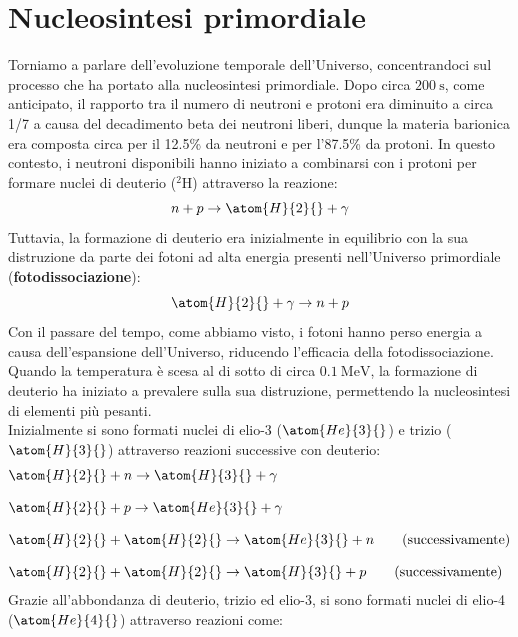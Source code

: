 \section{Nucleosintesi primordiale}
Torniamo a parlare dell'evoluzione temporale dell'Universo, concentrandoci sul processo che ha portato alla nucleosintesi primordiale. Dopo circa $\qty{200}{\second}$, come anticipato, il rapporto tra il numero di neutroni e protoni era diminuito a circa 1/7 a causa del decadimento beta dei neutroni liberi, dunque la materia barionica era composta circa per il 12.5\% da neutroni e per l'87.5\% da protoni. In questo contesto, i neutroni disponibili hanno iniziato a combinarsi con i protoni per formare nuclei di deuterio ($^2$H) attraverso la reazione:
\begin{equation}
    n + p \rightarrow \atom{H}{2}{} + \gamma
\end{equation}
Tuttavia, la formazione di deuterio era inizialmente in equilibrio con la sua distruzione da parte dei fotoni ad alta energia presenti nell'Universo primordiale (\textbf{fotodissociazione}):
\begin{equation}
    \atom{H}{2}{} + \gamma \rightarrow n + p
\end{equation}
Con il passare del tempo, come abbiamo visto, i fotoni hanno perso energia a causa dell'espansione dell'Universo, riducendo l'efficacia della fotodissociazione. Quando la temperatura è scesa al di sotto di circa $\qty{0.1}{\mega\electronvolt}$, la formazione di deuterio ha iniziato a prevalere sulla sua distruzione, permettendo la nucleosintesi di elementi più pesanti.\\
Inizialmente si sono formati nuclei di elio-3 ($\atom{He}{3}{}$) e trizio ($\atom{H}{3}{}$) attraverso reazioni successive con deuterio:
\begin{equation}
    \begin{split}
        &\atom{H}{2}{} + n \rightarrow \atom{H}{3}{} + \gamma \\[8pt]
        &\atom{H}{2}{} + p \rightarrow \atom{He}{3}{} + \gamma \\[8pt]
        &\atom{H}{2}{} + \atom{H}{2}{} \rightarrow \atom{He}{3}{} + n \qquad (\text{successivamente})\\[8pt]
        &\atom{H}{2}{} + \atom{H}{2}{} \rightarrow \atom{H}{3}{} + p \qquad (\text{successivamente})
    \end{split}
\end{equation}
Grazie all'abbondanza di deuterio, trizio ed elio-3, si sono formati nuclei di elio-4 ($\atom{He}{4}{}$) attraverso reazioni come:

